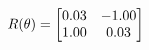 \documentclass[preview]{standalone}
\begin{document}
\begin{align*}
\special{dvisvgm:raw <g id='unique000'>}R(\theta) = \begin{bmatrix}0.03 & -1.00\\1.00 & 0.03\end{bmatrix}\special{dvisvgm:raw </g>}
\end{align*}
\end{document}
